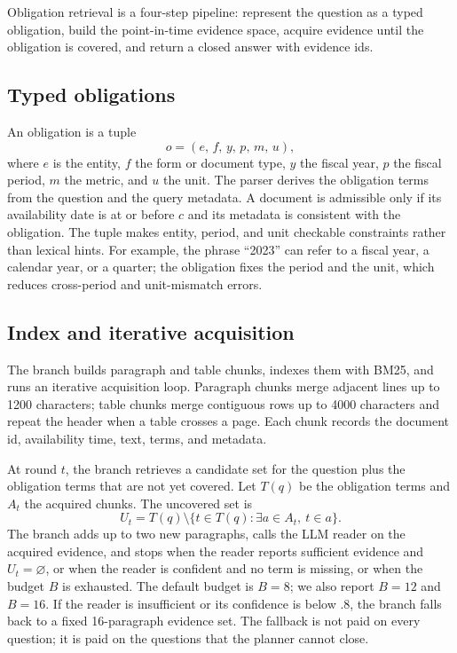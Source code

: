 \documentclass[11pt]{article}
\begin{document}
Obligation retrieval is a four-step pipeline: represent the question as a typed obligation, build the point-in-time evidence space, acquire evidence until the obligation is covered, and return a closed answer with evidence ids.

\subsection{Typed obligations}
An obligation is a tuple
\begin{equation}
o=(e,\,f,\,y,\,p,\,m,\,u),
\end{equation}
where $e$ is the entity, $f$ the form or document type, $y$ the fiscal year, $p$ the fiscal period, $m$ the metric, and $u$ the unit. The parser derives the obligation terms from the question and the query metadata. A document is admissible only if its availability date is at or before $c$ and its metadata is consistent with the obligation. The tuple makes entity, period, and unit checkable constraints rather than lexical hints. For example, the phrase ``2023'' can refer to a fiscal year, a calendar year, or a quarter; the obligation fixes the period and the unit, which reduces cross-period and unit-mismatch errors.

\subsection{Index and iterative acquisition}
The branch builds paragraph and table chunks, indexes them with BM25, and runs an iterative acquisition loop. Paragraph chunks merge adjacent lines up to 1200 characters; table chunks merge contiguous rows up to 4000 characters and repeat the header when a table crosses a page. Each chunk records the document id, availability time, text, terms, and metadata.

At round $t$, the branch retrieves a candidate set for the question plus the obligation terms that are not yet covered. Let $T(q)$ be the obligation terms and $A_t$ the acquired chunks. The uncovered set is
\begin{equation}
U_t=T(q)\setminus\{t\in T(q):\exists a\in A_t,\ t\in a\}.
\end{equation}
The branch adds up to two new paragraphs, calls the LLM reader on the acquired evidence, and stops when the reader reports sufficient evidence and $U_t=\varnothing$, or when the reader is confident and no term is missing, or when the budget $B$ is exhausted. The default budget is $B=8$; we also report $B=12$ and $B=16$. If the reader is insufficient or its confidence is below .8, the branch falls back to a fixed 16-paragraph evidence set. The fallback is not paid on every question; it is paid on the questions that the planner cannot close.
\end{document}
